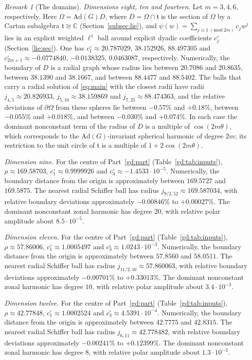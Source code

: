 \documentclass[11pt]{amsart}
\theoremstyle{definition}
\theoremstyle{remark}
\newtheorem{remark}[theorem]{Remark}
\numberwithin{equation}{section}
\newcommand{\C}{\mathbb{C}}
\begin{document}
\begin{remark}[The domains]
\emph{Dimensions eight, ten and fourteen.} Let $m=3,4,6$, respectively. Here $\Omega=\mathrm{Ad}(G)D$, where $D=\Omega\cap\mathfrak t$ is the section of $\Omega$ by a Cartan subalgebra $\mathfrak t\cong\C$ (Section~\ref{subsec:lie}), and $\psi(w)=\sum_{j\equiv1\ (\mathrm{mod}\ 2m)}c_jw^j$ lies in an explicit weighted $\ell^1$ ball around explicit dyadic coefficients $c^\circ_j$ (Section~\ref{lie:sec}). One has $c_1^\circ\approx20.787029$, $38.152926$, $88.497305$ and $c^\circ_{2m+1}\approx-0.0774840$, $-0.0138325$, $0.0463087$, respectively. Numerically, the boundary of $D$ is a radial graph whose radius lies between $20.7086$ and $20.8635$, between $38.1390$ and $38.1667$, and between $88.4477$ and $88.5402$. The balls that carry a radial solution of \eqref{eq:main} with the closest radii have radii $j_{4,5}\approx20.826933$, $j_{5,10}\approx38.159869$ and $j_{7,25}\approx88.474363$, and the relative deviations of $\partial\Omega$ from these spheres lie between $-0.57\%$ and $+0.18\%$, between $-0.055\%$ and $+0.018\%$, and between $-0.030\%$ and $+0.074\%$. In each case the dominant nonconstant term of the radius of $D$ is a multiple of $\cos(2m\theta)$, which corresponds to the $\mathrm{Ad}(G)$-invariant spherical harmonic of degree $2m$; its restriction to the unit circle of $\mathfrak t$ is a multiple of $1+2\cos(2m\theta)$.

\emph{Dimension nine.} For the centre of Part~\ref{gd:part} (Table~\ref{gd:tab:inputs}), $\rho\approx169.58703$, $c_1^\circ\approx0.9999926$ and $c_3^\circ\approx-1.4533\cdot10^{-5}$. Numerically, the boundary distance from the origin is approximately between $169.5727$ and $169.5875$. The nearest radial Schiffer ball has radius $j_{9/2,52}\approx169.587034$, with relative boundary deviations approximately $-0.00846\%$ to $+0.00027\%$. The dominant nonconstant zonal harmonic has degree $20$, with relative polar amplitude about $8.5\cdot10^{-5}$.

\emph{Dimension eleven.} For the centre of Part~\ref{gd:part} (Table~\ref{gd:tab:inputs}), $\rho\approx57.86006$, $c_1^\circ\approx1.0005497$ and $c_3^\circ\approx1.0243\cdot10^{-3}$. Numerically, the boundary distance from the origin is approximately between $57.8560$ and $58.0511$. The nearest radial Schiffer ball has radius $j_{11/2,16}\approx57.860063$, with relative boundary deviations approximately $-0.00701\%$ to $+0.33013\%$. The dominant nonconstant zonal harmonic has degree $10$, with relative polar amplitude about $3.4\cdot10^{-3}$.

\emph{Dimension twelve.} For the centre of Part~\ref{gd:part} (Table~\ref{gd:tab:inputs}), $\rho\approx42.77848$, $c_1^\circ\approx1.0002524$ and $c_3^\circ\approx4.5391\cdot10^{-4}$. Numerically, the boundary distance from the origin is approximately between $42.7775$ and $42.8315$. The nearest radial Schiffer ball has radius $j_{6,11}\approx42.778482$, with relative boundary deviations approximately $-0.00241\%$ to $+0.12399\%$. The dominant nonconstant zonal harmonic has degree $8$, with relative polar amplitude about $1.3\cdot10^{-3}$.


\end{remark}
\end{document}
